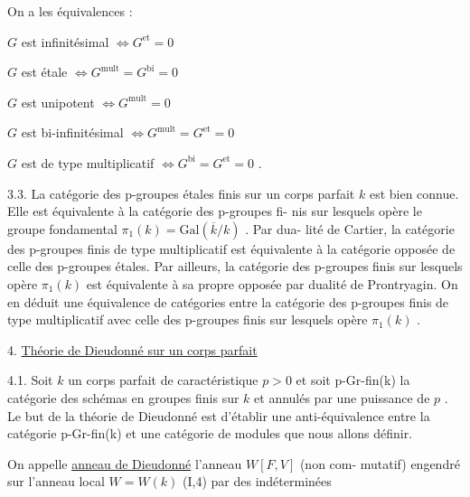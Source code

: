 
On a les équivalences :

$G$ est infinitésimal $\Longleftrightarrow G^{\mathrm{et}} = 0$

$G$ est étale $\Longleftrightarrow G^{\mathrm{mult}} = G^{\mathrm{bi}} = 0$

$G$ est unipotent $\Longleftrightarrow G^{\mathrm{mult}} = 0$

$G$ est bi-infinitésimal $\Longleftrightarrow G^{\mathrm{mult}} = G^{\mathrm{et}} = 0$

$G$ est de type multiplicatif $\Longleftrightarrow G^{\mathrm{bi}} = G^{\mathrm{et}} = 0$ .

3.3. La catégorie des p-groupes étales finis sur un corps parfait
$k$ est bien connue. Elle est équivalente à la catégorie des p-groupes fi-%
nis sur lesquels opère le groupe fondamental $\pi_1(k) = \mathrm{Gal}(\overline{k}/k)$ . Par dua-%
lité de Cartier, la catégorie des p-groupes finis de type multiplicatif
est équivalente à la catégorie opposée de celle des p-groupes étales. Par
ailleurs, la catégorie des p-groupes finis sur lesquels opère $\pi_1(k)$ est
équivalente à sa propre opposée par dualité de Prontryagin. On en déduit
une équivalence de catégories entre la catégorie des p-groupes finis de
type multiplicatif avec celle des p-groupes finis sur lesquels opère $\pi_1(k)$ .

4. \uline{Théorie de Dieudonné sur un corps parfait}

4.1. Soit $k$ un corps parfait de caractéristique $p > 0$ et soit
p-Gr-fin(k) la catégorie des schémas en groupes finis sur $k$ et annulés
par une puissance de $p$ . Le but de la théorie de Dieudonné est d'établir
une anti-équivalence entre la catégorie p-Gr-fin(k) et une catégorie de
modules que nous allons définir.

On appelle \uline{anneau de Dieudonné}  l'anneau $W[F,V]$ (non com-%
mutatif) engendré sur l'anneau local $W = W(k)$ (I,4) par des indéterminées

